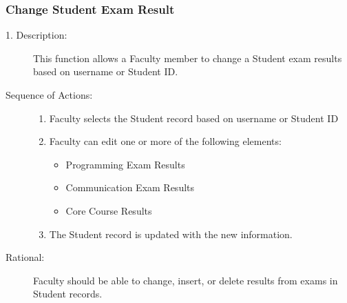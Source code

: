    \subsubsection{\large Change Student Exam Result} 
   \begin{boxed} %
      \begin{description}
         \item[1. Description:\label{desc:change_result}]
      This function allows a Faculty member to change a Student exam results
      based on username or Student ID.
         
            \item[Sequence of Actions:]\hspace{10cm}
         \begin{enumerate}
               
            \item Faculty selects the Student record based on username or
               Student ID
            \item Faculty can edit one or more of the following elements:
            \begin{itemize}
               \item Programming Exam Results
               \item Communication Exam Results
               \item Core Course Results
            \end{itemize}
         \item The Student record is updated with the new information.
      \end{enumerate}

            \item[Rational:]
         Faculty should be able to change, insert, or delete results from exams
         in Student records.
      \end{description}
   \end{boxed} %

